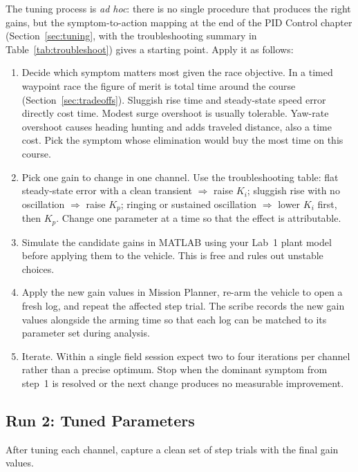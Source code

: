 \documentclass[../../book.tex]{subfiles}
\begin{document}
The tuning process is \emph{ad hoc}: there is no single procedure that produces the right gains, but the symptom-to-action mapping at the end of the PID Control chapter (Section~\ref{sec:tuning}, with the troubleshooting summary in Table~\ref{tab:troubleshoot}) gives a starting point.  Apply it as follows:

\begin{enumerate}
  \item Decide which symptom matters most given the race objective.  In a timed waypoint race the figure of merit is total time around the course (Section~\ref{sec:tradeoffs}).  Sluggish rise time and steady-state speed error directly cost time.  Modest surge overshoot is usually tolerable.  Yaw-rate overshoot causes heading hunting and adds traveled distance, also a time cost.  Pick the symptom whose elimination would buy the most time on this course.
  \item Pick one gain to change in one channel.  Use the troubleshooting table: flat steady-state error with a clean transient $\Rightarrow$ raise $K_i$; sluggish rise with no oscillation $\Rightarrow$ raise $K_p$; ringing or sustained oscillation $\Rightarrow$ lower $K_i$ first, then $K_p$.  Change one parameter at a time so that the effect is attributable.
  \item Simulate the candidate gains in MATLAB using your Lab~1 plant model before applying them to the vehicle.  This is free and rules out unstable choices.
  \item Apply the new gain values in Mission Planner, re-arm the vehicle to open a fresh log, and repeat the affected step trial.  The scribe records the new gain values alongside the arming time so that each log can be matched to its parameter set during analysis.
  \item Iterate.  Within a single field session expect two to four iterations per channel rather than a precise optimum.  Stop when the dominant symptom from step~1 is resolved or the next change produces no measurable improvement.
\end{enumerate}

\subsection{Run 2: Tuned Parameters}

After tuning each channel, capture a clean set of step trials with the final gain values.
\end{document}
